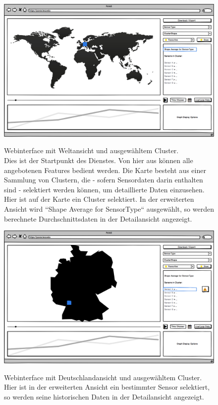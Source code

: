 \begin{figure}[H]
	\centering
		\includegraphics[width=0.9\linewidth]{gui/frontend/FrontGUIWorldWithShapeSelection.png}\\
	\caption{Webinterface mit Weltansicht und ausgewähltem Cluster.\\
	Dies ist der Startpunkt des Dienstes. Von hier aus können alle angebotenen Features bedient werden. Die Karte besteht aus einer Sammlung von Clustern, die - sofern Sensordaten darin enthalten sind - selektiert werden können, um detaillierte Daten einzusehen.\\
	Hier ist auf der Karte ein Cluster selektiert. In der erweiterten Ansicht wird ``Shape Average for SensorType`` ausgewählt, so werden berechnete Durchschnittsdaten in der Detailansicht angezeigt.}
\end{figure}

\begin{figure}[H]
	\centering
		\includegraphics[width=0.9\linewidth]{gui/frontend/FrontGUIGermanyWithShapeSelection.png}\\
	\caption{Webinterface mit Deutschlandansicht und ausgewähltem Cluster.\\
	Hier ist in der erweiterten Ansicht ein bestimmter Sensor selektiert, so werden seine historischen Daten in der Detailansicht angezeigt.}
\end{figure}

